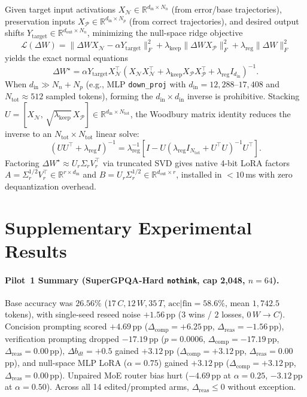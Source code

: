\documentclass[10pt]{article}
\begin{document}
Given target input activations $X_{\mathcal{N}} \in \mathbb{R}^{d_{\mathrm{in}}\times N_n}$ (from error/base trajectories), preservation inputs $X_{\mathcal{P}} \in \mathbb{R}^{d_{\mathrm{in}}\times N_p}$ (from correct trajectories), and desired output shifts $Y_{\mathrm{target}} \in \mathbb{R}^{d_{\mathrm{out}}\times N_n}$, minimizing the null-space ridge objective
\[
\mathcal{L}(\Delta W) = \|\Delta W X_{\mathcal{N}} - \alpha Y_{\mathrm{target}}\|_F^2 + \lambda_{\mathrm{keep}}\|\Delta W X_{\mathcal{P}}\|_F^2 + \lambda_{\mathrm{reg}}\|\Delta W\|_F^2
\]
yields the exact normal equations
\[
\Delta W^\star = \alpha Y_{\mathrm{target}} X_{\mathcal{N}}^\top \left(X_{\mathcal{N}} X_{\mathcal{N}}^\top + \lambda_{\mathrm{keep}} X_{\mathcal{P}} X_{\mathcal{P}}^\top + \lambda_{\mathrm{reg}} I_{d_{\mathrm{in}}}\right)^{-1}.
\]
When $d_{\mathrm{in}} \gg N_n + N_p$ (e.g., MLP \texttt{down\_proj} with $d_{\mathrm{in}} = 12{,}288\text{--}17{,}408$ and $N_{\mathrm{tot}} \approx 512$ sampled tokens), forming the $d_{\mathrm{in}}\times d_{\mathrm{in}}$ inverse is prohibitive. Stacking $U = [X_{\mathcal{N}},\, \sqrt{\lambda_{\mathrm{keep}}}\, X_{\mathcal{P}}] \in \mathbb{R}^{d_{\mathrm{in}}\times N_{\mathrm{tot}}}$, the Woodbury matrix identity reduces the inverse to an $N_{\mathrm{tot}} \times N_{\mathrm{tot}}$ linear solve:
\[
\left(U U^\top + \lambda_{\mathrm{reg}} I\right)^{-1} = \lambda_{\mathrm{reg}}^{-1}\left[I - U\left(\lambda_{\mathrm{reg}} I_{N_{\mathrm{tot}}} + U^\top U\right)^{-1} U^\top\right].
\]
Factoring $\Delta W^\star \approx U_r \Sigma_r V_r^\top$ via truncated SVD gives native 4-bit LoRA factors $A = \Sigma_r^{1/2} V_r^\top \in \mathbb{R}^{r\times d_{\mathrm{in}}}$ and $B = U_r \Sigma_r^{1/2} \in \mathbb{R}^{d_{\mathrm{out}}\times r}$, installed in $<10$\,ms with zero dequantization overhead.

\section{Supplementary Experimental Results}
\label{app:supp}

\paragraph{Pilot~1 Summary (SuperGPQA-Hard \texttt{nothink}, cap 2,048, $n=64$).}
Base accuracy was $26.56\%$ ($17\,C, 12\,W, 35\,T$, $\mathrm{acc}|\mathrm{fin}=58.6\%$, mean $1{,}742.5$ tokens), with single-seed reseed noise $+1.56$\,pp ($3$ wins / $2$ losses, $0\,W\!\to\!C$). Concision prompting scored $+4.69$\,pp ($\Delta_{\mathrm{comp}}=+6.25$\,pp, $\Delta_{\mathrm{reas}}=-1.56$\,pp), verification prompting dropped $-17.19$\,pp ($p=0.0006$, $\Delta_{\mathrm{comp}}=-17.19$\,pp, $\Delta_{\mathrm{reas}}=0.00$\,pp), $\Delta b_{dt}=+0.5$ gained $+3.12$\,pp ($\Delta_{\mathrm{comp}}=+3.12$\,pp, $\Delta_{\mathrm{reas}}=0.00$\,pp), and null-space MLP LoRA ($\alpha=0.75$) gained $+3.12$\,pp ($\Delta_{\mathrm{comp}}=+3.12$\,pp, $\Delta_{\mathrm{reas}}=0.00$\,pp). Unpaired MoE router bias hurt ($-4.69$\,pp at $\alpha=0.25$, $-3.12$\,pp at $\alpha=0.50$). Across all 14 edited/prompted arms, $\Delta_{\mathrm{reas}} \le 0$ without exception.
\end{document}
